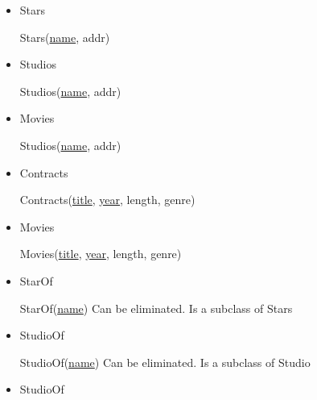 \documentclass[12pt]{article}
\begin{document}
\begin{enumerate}[1.]
\begin{enumerate}[a)]
        \begin{itemize}
            \item Stars

            \bigskip

            Stars(\underline{name}, addr)

            \bigskip

            \item Studios

            \bigskip

            Studios(\underline{name}, addr)

            \bigskip

            \item Movies

            \bigskip

            Studios(\underline{name}, addr)

            \bigskip

            \item Contracts

            \bigskip

            Contracts(\underline{title}, \underline{year}, length, genre)

            \bigskip

            \item Movies

            \bigskip

            Movies(\underline{title}, \underline{year}, length, genre)

            \bigskip

            \item StarOf

            \bigskip

            StarOf(\underline{name}) \color{red}Can be eliminated. Is a subclass of Stars\color{black}

            \bigskip

            \item StudioOf

            \bigskip

            StudioOf(\underline{name}) \color{red}Can be eliminated. Is a subclass of Studio\color{black}

            \bigskip

            \item StudioOf

            \bigskip


\end{itemize}
\end{enumerate}
\end{enumerate}
\end{document}
